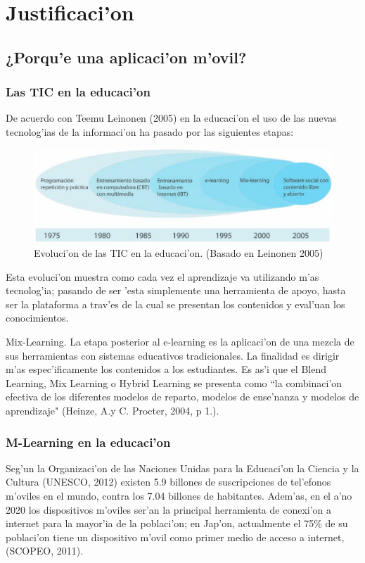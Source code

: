 \chapter{Justificaci'on}
\section{¿Porqu'e una aplicaci'on m'ovil?}
\subsection{Las TIC en la educaci'on}
De acuerdo con Teemu Leinonen (2005) en la educaci'on el uso de las nuevas tecnolog'ias de la informaci'on ha pasado por las siguientes etapas:

\begin{figure}
	\begin{center}
		\includegraphics[scale=0.5]{img/img1.png} 
		\caption{Evoluci'on de las TIC en la educaci'on. (Basado en Leinonen 2005)}
		\label{tic}
	\end{center}
\end{figure}

Esta evoluci'on muestra como cada vez el aprendizaje va utilizando m'as tecnolog'ia; pasando de ser 'esta simplemente una herramienta de apoyo, hasta ser la plataforma a trav'es de la cual se presentan los contenidos y eval'uan los conocimientos. 

Mix-Learning. La etapa posterior al e-learning es la aplicaci'on de una mezcla de sus herramientas con sistemas educativos tradicionales. La finalidad es dirigir m'as espec'ificamente los contenidos a los estudiantes. Es as'i que el Blend Learning, Mix Learning o Hybrid Learning se presenta como ``la combinaci'on efectiva de los diferentes modelos de reparto, modelos de ense'nanza y modelos de aprendizaje" (Heinze, A.y C. Procter, 2004, p 1.).

\subsection{M-Learning en la educaci'on}
Seg'un la Organizaci'on de las Naciones Unidas para la Educaci'on la Ciencia y la Cultura (UNESCO, 2012) existen 5.9 billones de suscripciones de tel'efonos m'oviles en el mundo, contra los 7.04 billones de habitantes. Adem'as, en el a'no 2020 los dispositivos m'oviles ser'an la principal herramienta de conexi'on a internet para la mayor'ia de la poblaci'on; en Jap'on, actualmente el 75\% de su poblaci'on tiene un dispositivo m'ovil como primer medio de acceso a internet, (SCOPEO, 2011). 

